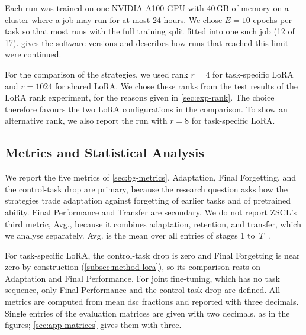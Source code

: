Each run was trained on one NVIDIA A100 GPU with 40\,GB of memory on a cluster where a job may run for at most 24 hours.
We chose $E = 10$ epochs per task so that most runs with the full training split fitted into one such job (12 of 17).
 gives the software versions and describes how runs that reached this limit were continued.

For the comparison of the strategies, we used rank $r = 4$ for task-specific LoRA and $r = 1024$ for shared LoRA.
We chose these ranks from the test results of the LoRA rank experiment, for the reasons given in \cref{sec:exp-rank}.
The choice therefore favours the two LoRA configurations in the comparison.
To show an alternative rank, we also report the run with $r = 8$ for task-specific LoRA.

\subsection{Metrics and Statistical Analysis}
\label{subsec:exp-metrics}

We report the five metrics of \cref{sec:bg-metrics}.
Adaptation, Final Forgetting, and the control-task drop are primary, because the research question asks how the strategies trade adaptation against forgetting of earlier tasks and of pretrained ability.
Final Performance and Transfer are secondary.
We do not report ZSCL's third metric, Avg., because it combines adaptation, retention, and transfer, which we analyse separately.
Avg. is the mean over all entries of stages 1 to~$T$~\cite[Sec.~4]{zheng2023preventingzeroshottransferdegradation}.

For task-specific LoRA, the control-task drop is zero and Final Forgetting is near zero by construction (\cref{subsec:method-lora}), so its comparison rests on Adaptation and Final Performance.
For joint fine-tuning, which has no task sequence, only Final Performance and the control-task drop are defined.
All metrics are computed from mean \gls{dsc} fractions and reported with three decimals.
Single entries of the evaluation matrices are given with two decimals, as in the figures; \cref{sec:app-matrices} gives them with three.

